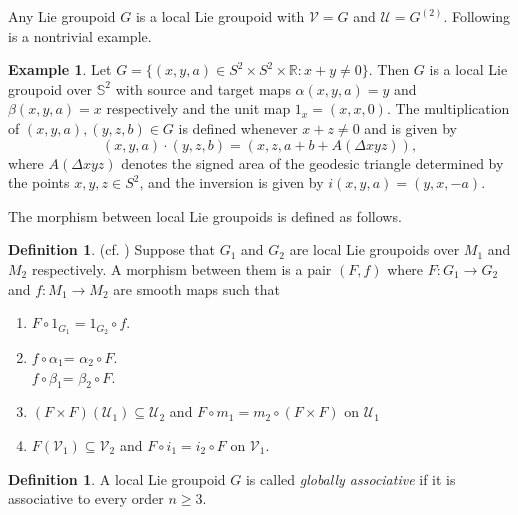 \documentclass[12pt,a4paper]{amsart}
\theoremstyle{plain}
\theoremstyle{definition}
\newtheorem{definition}[theorem]{Definition}
\newtheorem{example}[theorem]{Example}
\begin{document}
Any Lie groupoid $G$ is a local Lie groupoid with $\mathcal{V}=G$ and $\mathcal{U}=G^{(2)}$.
Following is a nontrivial example.
   
\begin{example}\label{ex1}
Let $G=\{(x,y,a)\in S^2\times S^2\times \mathbb R:x+y\neq 0\}$. Then $G$ is a local Lie groupoid over $\mathbb{S}^{2}$ with source and target maps $\alpha(x,y,a)=y$ and $\beta(x,y,a)=x$ respectively and the unit map $1_x=(x,x,0)$. The multiplication of $(x,y,a),(y,z,b)\in G$ is defined whenever $x+z\neq 0$ and is given by 
\[
(x,y,a)\cdot (y,z,b)
=
(x,z,a+b+A(\Delta xyz)),
\]
where $A(\Delta xyz)$ denotes the signed area of the geodesic triangle determined by the points $x,y,z\in S^2$, and the inversion is given by
$i(x,y,a)=(y,x,-a)$.
\end{example}
The morphism between local Lie groupoids is defined as follows.
\begin{definition} (cf. \cite{Fernandes})
    Suppose that $G_1$ and $G_2$ are local Lie groupoids over $M_1$ and $M_2$ respectively. A  morphism  between them is a pair $(F,f)$ where $F: G_1 \rightarrow G_2$ and $f: M_1 \rightarrow M_2$ are smooth maps such that
    \begin{enumerate}
        \item $F\circ 1_{G_1}=1_{G_2}\circ f$.
        \item $f \circ \alpha_1$= $\alpha_2 \circ F$.\\ $f \circ \beta_1$= $\beta_2 \circ F$.
        \item $ (F \times F)(\mathcal{U}_1)\subseteq \mathcal{U}_2$ and $F \circ m_1  = m_2 \circ (F \times F)$ on $\mathcal{U}_1$
        \item $F(\mathcal{V}_1)\subseteq \mathcal{V}_2$ and $F \circ i_1 = i_2 \circ F$ on $\mathcal{V}_1$.
    \end{enumerate}
\end{definition}


\begin{definition}
A local Lie groupoid $G$ is called \emph{globally associative} if it is associative to every order $n \geq 3$.
\end{definition}
\end{document}
